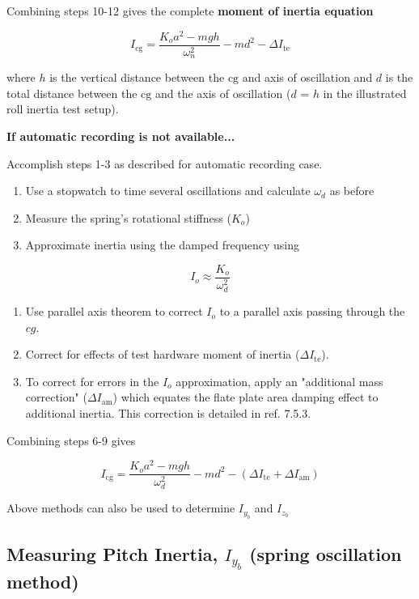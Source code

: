 \documentclass[
]{book}
\providecommand{\tightlist}{%
  \setlength{\itemsep}{0pt}\setlength{\parskip}{0pt}}
\begin{document}
Combining steps 10-12 gives the complete \textbf{moment of inertia equation}

\[ I_{\mathrm{cg}} = \frac{K_o a^2 - mgh}{\omega_n^2} - md^2 - \Delta I_{\mathrm{te}} \]

where \(h\) is the vertical distance between the \(\mathrm{cg}\) and axis of oscillation and \(d\) is the total distance between the \(\mathrm{cg}\) and the axis of oscillation (\(d\) = \(h\) in the illustrated roll inertia test setup).

\textbf{If automatic recording is not available...}

Accomplish steps 1-3 as described for automatic recording case.

\begin{enumerate}
\def\labelenumi{\arabic{enumi}.}
\setcounter{enumi}{3}
\tightlist
\item
  Use a stopwatch to time several oscillations and calculate \(\omega_d\) as before
\item
  Measure the spring's rotational stiffness (\(K_o\))
\item
  Approximate inertia using the damped frequency using
\end{enumerate}

\[ I_o \approx \frac{K_o}{\omega_d^2}  \]

\begin{enumerate}
\def\labelenumi{\arabic{enumi}.}
\setcounter{enumi}{6}
\tightlist
\item
  Use parallel axis theorem to correct \(I_o\) to a parallel axis passing through the \(cg\).
\item
  Correct for effects of test hardware moment of inertia (\(\Delta I_{\mathrm{te}}\)).
\item
  To correct for errors in the \(I_o\) approximation, apply an "additional mass correction" (\(\Delta I_{\mathrm{am}}\)) which equates the flate plate area damping effect to additional inertia. This correction is detailed in ref. 7.5.3.
\end{enumerate}

Combining steps 6-9 gives

\[ I_{\mathrm{cg}} = \frac{K_o a^2 - mgh}{\omega_d^2} - md^2 - \left(\Delta I_{\mathrm{te}} + \Delta I_{\mathrm{am}} \right) \]

Above methods can also be used to determine \(I_{y_b}\) and \(I_{z_b}\)

\hypertarget{measuring-pitch-inertia-i_y_b-spring-oscillation-method}{%
\subsection{\texorpdfstring{Measuring Pitch Inertia, \(I_{y_b}\) (spring oscillation method)}{Measuring Pitch Inertia, I\_\{y\_b\} (spring oscillation method)}}\label{measuring-pitch-inertia-i_y_b-spring-oscillation-method}}
\end{document}
